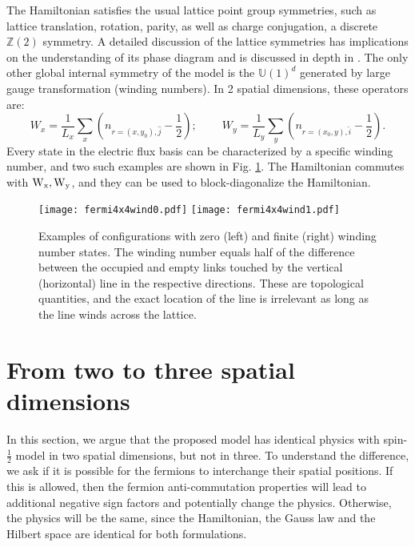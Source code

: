 \documentclass[a4paper,11pt]{article}
\begin{document}
 The Hamiltonian satisfies the usual lattice point group symmetries, such as lattice translation, rotation, parity,
as well as charge conjugation, a discrete $\mathbb{Z}(2)$ symmetry. A detailed discussion
of the lattice symmetries has implications on the understanding of its phase diagram and is discussed in depth
in \cite{Flink2021}. The only other global internal symmetry of the model is the $\mathbb{U}(1)^d$
generated by large gauge transformation (winding numbers). In 2 spatial dimensions, these operators are:
\begin{equation}
{W}_{x} = \frac{1}{{L}_{x}} \sum_x ({n}_{r=(x,y_0),\hat{j}} - \frac{1}{2});~~~~~~~~~~
{W}_{y} = \frac{1}{{L}_{y}} \sum_y ({n}_{r=(x_0,y),\hat{i}} - \frac{1}{2}).
\end{equation}
Every state in the electric flux basis can be characterized by a specific winding number, and two such examples are 
shown in Fig. \ref{fig:Wind}. The Hamiltonian commutes with ${\rm W}_{\rm x}, {\rm W}_{\rm y}$, and they can be used
to block-diagonalize the Hamiltonian. 
\begin{figure}[!tbh]
 \begin{center}
 \texttt{[image: fermi4x4wind0.pdf]}
 \texttt{[image: fermi4x4wind1.pdf]}
 \end{center}
 \caption{ Examples of configurations with zero (left) and finite (right) winding number states. The winding number
 equals half of the difference between the occupied and empty links touched by the vertical (horizontal) line in 
 the respective directions. These are topological quantities, and the exact location of the line is irrelevant as 
 long as the line winds across the lattice.}
 \label{fig:Wind}
\end{figure}

\section{From two to three spatial dimensions}
 In this section, we argue that the proposed model has identical physics with spin-$\frac{1}{2}$ model in two spatial
dimensions, but not in three. To understand the difference, we ask if it is possible for the fermions to interchange
their spatial positions. If this is allowed, then the fermion anti-commutation properties will lead to additional negative sign factors and potentially change the physics.
Otherwise, the physics will be the same, since the Hamiltonian, the Gauss law and the Hilbert space are identical
for both formulations.
\end{document}
